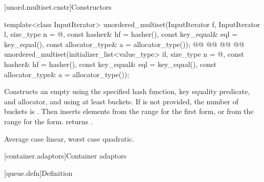 \documentclass{wg21}
\begin{document}
[unord.multiset.cnstr]{Constructors}


%
\begin{itemdecl}
template<class InputIterator>
unordered_multiset(InputIterator f, InputIterator l,
    size_type n = @\seebelow@,
    const hasher& hf = hasher(),
    const key_equal& eql = key_equal(),
    const allocator_type& a = allocator_type());
@@
@@
    @@
    @@
unordered_multiset(initializer_list<value_type> il,
    size_type n = @\seebelow@,
    const hasher& hf = hasher(),
    const key_equal& eql = key_equal(),
    const allocator_type& a = allocator_type());
\end{itemdecl}

\begin{itemdescr}
    \pnum
    \effects
    Constructs an empty  using the
    specified hash function, key equality predicate, and allocator, and
    using at least  buckets. If  is not
    provided, the number of buckets is . Then
    inserts elements from the range 
    for the first form,  or from the range
     for the  form.
     returns .

    \pnum
    \complexity
    Average case linear, worst case quadratic.
\end{itemdescr}

[container.adaptors]{Container adaptors}


[queue.defn]{Definition}
\end{document}
